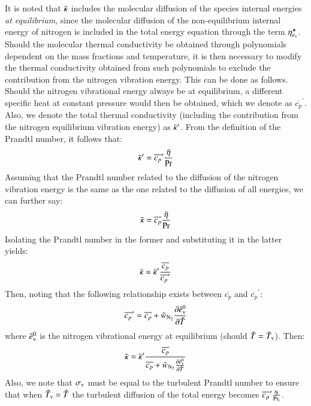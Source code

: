 \documentclass{warpdoc}
\newcommand{\Cp}{{c_{p}}}
\newcommand{\turb}{_{\rm t}}
\newcommand{\etat}{{\eta\turb}}
\newcommand{\ev}{e_{\rm v}}
\newcommand{\tildeevzero}{\wtilde{e}_{\rm v}^0}
\begin{document}
It is noted that $\bar{\kappa}$ includes the molecular diffusion of
the species internal energies \emph{at equilibrium}, since the molecular diffusion
of the non-equilibrium internal energy of nitrogen is included in the total energy equation through the term $\eta_{\ev}^\star$. Should the molecular thermal conductivity
be obtained through polynomials dependent on the mass fractions and temperature, it is then necessary to modify the thermal conductivity obtained from such polynomials to exclude the contribution from the nitrogen vibration energy. This can be done as follows. Should the nitrogen vibrational energy always be at equilibrium, a different specific heat at constant pressure would then be obtained, which we denote as $\overline{\Cp}^\prime$.
Also, we denote the total thermal conductivity (including the contribution from the nitrogen equilibrium vibration energy) as $\bar{\kappa}^\prime$.
From the definition of the Prandtl number, it follows that:
%
\begin{equation}
  \wbar{\kappa}^\prime=\overline{\Cp}^\prime \frac{\wbar{\eta}}{\rm Pr}
\end{equation}
%
Assuming that the Prandtl number related to the diffusion of the nitrogen vibration energy is the same as the one related to the diffusion of all energies, we can further say:
%
\begin{equation}
  \wbar{\kappa}=\overline{\Cp} \frac{\wbar{\eta}}{\rm Pr}
\end{equation}
%
Isolating the Prandtl number in the former and substituting it in the latter yields:
%
\begin{equation}
  \wbar{\kappa}= \wbar{\kappa}^\prime\frac{\overline{\Cp}}{\overline{\Cp}^\prime }
\end{equation}
%
Then, noting that the following relationship exists between $\overline{\Cp}$
and $\overline{\Cp}^\prime$:
%
\begin{equation}
  \overline{\Cp}^\prime=  \overline{\Cp}+ {\wtilde{w}_{\rm N_2}} \frac{\partial \tildeevzero}{\partial \wtilde{T}}
\label{eqn:cpprime}
\end{equation}
%
where $\tildeevzero$ is the nitrogen vibrational energy at equilibrium (should $\tilde{T}=\tilde{T}_{\rm v}$).
Then:
%
\begin{equation}
  \wbar{\kappa}= \wbar{\kappa}^\prime\frac{\overline{\Cp}}{\overline{\Cp}+ {\wtilde{w}_{\rm N_2}} \frac{\partial \tildeevzero}{\partial \wtilde{T}}}
\end{equation}
%
Also, we note that $\sigma_{\rm v}$ must be equal to the turbulent Prandtl number to ensure that when $\tilde{T}_v=\tilde{T}$ the turbulent diffusion of the total energy becomes $\overline{\Cp}^\prime \frac{\etat}{\rm Pr_t}$.
\end{document}
